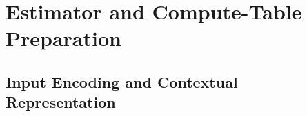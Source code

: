 \documentclass[conference,9pt,letterpaper]{IEEEtran}
\begin{document}





\section{Estimator and Compute-Table Preparation}
\subsection{Input Encoding and Contextual Representation}
\end{document}
